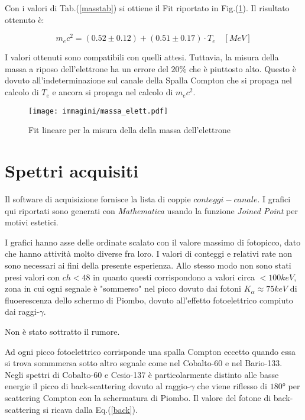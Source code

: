 \documentclass[12pt,a4paper,openright,twoside]{article}
\numberwithin{equation}{section} %
\begin{document}
Con i valori di Tab.(\ref{masstab}) si ottiene il Fit riportato in Fig.(\ref{massfit}). Il risultato ottenuto è:

\begin{equation}
\boxed{m_e c^2 = (0.52 \pm 0.12) + (0.51 \pm 0.17) \cdot T_e  \quad [MeV] }
\end{equation}

I valori ottenuti sono compatibili con quelli attesi. Tuttavia, la misura della massa a riposo dell'elettrone ha un errore del $20 \%$ che è piuttosto alto. Questo è dovuto all'indeterminazione sul canale della Spalla Compton che si propaga nel calcolo di $T_e$ e ancora si propaga nel calcolo di $m_e c^2$.

\begin{figure}[hbtp]
\centering
\texttt{[image: immagini/massa\_elett.pdf]}
\caption{Fit lineare per la misura della della massa dell'elettrone}
\label{massfit}
\end{figure}


\clearpage
\appendix 
\section{Spettri acquisiti} \label{a}
 
 \begin{figure}[h]
 \centering
 \end{figure}
 
Il software di acquisizione fornisce la lista di coppie $conteggi-canale$. I grafici qui riportati sono generati con \textit{Mathematica} usando la funzione \textit{Joined Point} per motivi estetici.

I grafici hanno asse delle ordinate scalato con il valore massimo di fotopicco, dato che hanno attività molto diverse fra loro. I valori di conteggi e relativi rate non sono necessari ai fini della presente esperienza. Allo stesso modo non sono stati presi valori con $ch<48$ in quanto questi corrispondono a valori circa $ < 100 keV$, zona in cui ogni segnale è "sommerso" nel picco dovuto dai fotoni $K_{\alpha} \approx 75 keV$ di fluoerescenza dello schermo di Piombo, dovuto all'effetto fotoelettrico compiuto dai raggi-$\gamma$.

Non è stato sottratto il rumore.

Ad ogni picco fotoelettrico corrisponde una spalla Compton eccetto quando essa si trova sommmersa sotto altro segnale come nel Cobalto-60 e nel Bario-133.
Negli spettri di Cobalto-60 e Cesio-137 è particolarmente distinto alle basse energie il picco di back-scattering dovuto al raggio-$\gamma$ che viene riflesso di $180°$ per scattering Compton con la schermatura di Piombo. Il valore del fotone di back-scattering si ricava dalla Eq.(\ref{back}).
\end{document}
